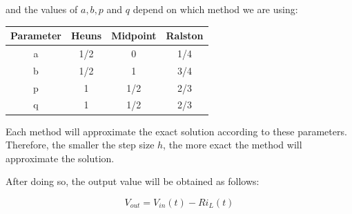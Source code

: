 \documentclass[10pt,a4paper]{article}
\begin{document}
and the values of $a, b, p$ and $q$ depend on which method we are using:

\begin{center}
 \begin{tabular}{||c | c c c||}
 \hline
 Parameter & Heuns & Midpoint & Ralston \\ [0.5ex]
 \hline\hline
 a & 1/2 & 0 & 1/4 \\
 \hline
 b & 1/2 & 1 & 3/4 \\
 \hline
 p & 1 & 1/2 & 2/3 \\
 \hline
 q & 1 & 1/2 & 2/3 \\ [1ex]
 \hline
\end{tabular}
\end{center}

Each method will approximate the exact solution according to these parameters. Therefore, the smaller the step size $h$, the more exact the method will approximate the solution.

 After doing so, the output value will be obtained as follows:

\[V_{out} = V_{in}(t) - R i_L(t)\]
\end{document}
